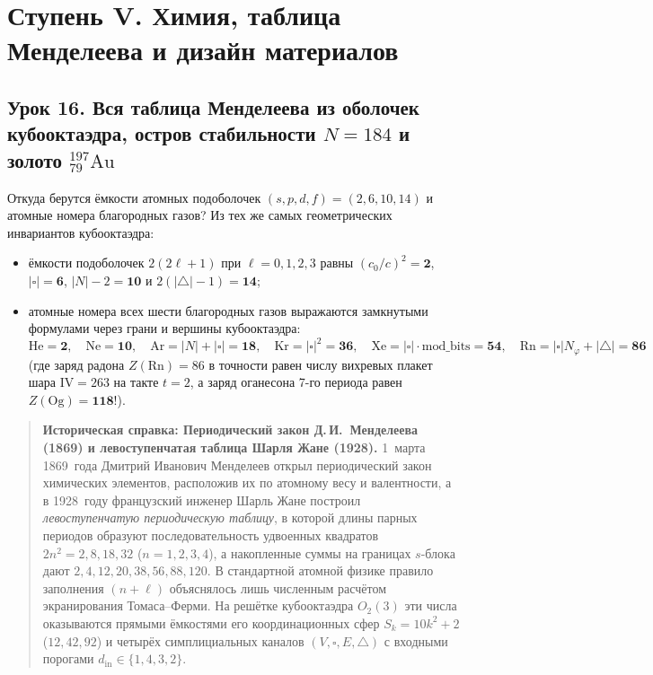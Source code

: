 \chapter{Ступень V. Химия, таблица Менделеева и дизайн материалов}
\label{ch:course-stage5-chemistry}

\section{Урок 16. Вся таблица Менделеева из оболочек кубооктаэдра, остров стабильности \texorpdfstring{$N = 184$}{N = 184} и золото \texorpdfstring{$^{197}_{79}\mathrm{Au}$}{197\_79 Au}}

Откуда берутся ёмкости атомных подоболочек $(s,p,d,f) = (2,6,10,14)$ и атомные номера благородных газов? Из тех же самых геометрических инвариантов кубооктаэдра:
\begin{itemize}[noitemsep]
\item ёмкости подоболочек $2(2\ell+1)$ при $\ell=0,1,2,3$ равны $(c_0/c)^2 = \mathbf{2}$, $|\square| = \mathbf{6}$, $|N|-2 = \mathbf{10}$ и $2(|{\triangle}|-1) = \mathbf{14}$;
\item атомные номера всех шести благородных газов выражаются замкнутыми формулами через грани и вершины кубооктаэдра:
  \[
    \mathrm{He} = \mathbf{2},\quad
    \mathrm{Ne} = \mathbf{10},\quad
    \mathrm{Ar} = |N|+|\square| = \mathbf{18},\quad
    \mathrm{Kr} = |\square|^2 = \mathbf{36},\quad
    \mathrm{Xe} = |\square|\cdot\mathrm{mod\_bits} = \mathbf{54},\quad
    \mathrm{Rn} = |\square|N_\varphi + |{\triangle}| = \mathbf{86}
  \]
  (где заряд радона $Z(\mathrm{Rn}) = 86$ в точности равен числу вихревых плакет шара $\mathrm{IV}=263$ на такте $t=2$, а заряд оганесона 7-го периода равен $Z(\mathrm{Og}) = \mathbf{118}$!).
\end{itemize}

\begin{quote}
\small\textbf{Историческая справка: Периодический закон Д.\,И.~Менделеева (1869) и левоступенчатая таблица Шарля Жане (1928).}
1~марта 1869~года Дмитрий Иванович Менделеев открыл периодический закон химических элементов, расположив их по атомному весу и валентности, а в 1928~году французский инженер Шарль Жане построил \emph{левоступенчатую периодическую таблицу}, в которой длины парных периодов образуют последовательность удвоенных квадратов $2n^2 = 2, 8, 18, 32$ ($n = 1, 2, 3, 4$), а накопленные суммы на границах $s$-блока дают $2, 4, 12, 20, 38, 56, 88, 120$. В стандартной атомной физике правило заполнения $(n + \ell)$ объяснялось лишь численным расчётом экранирования Томаса--Ферми. На решётке кубооктаэдра $O_2(3)$ эти числа оказываются прямыми ёмкостями его координационных сфер $S_k = 10k^2 + 2$ ($12, 42, 92$) и четырёх симплициальных каналов $(V, \square, E, \triangle)$ с входными порогами $d_{\mathrm{in}} \in \{1, 4, 3, 2\}$.
\end{quote}

